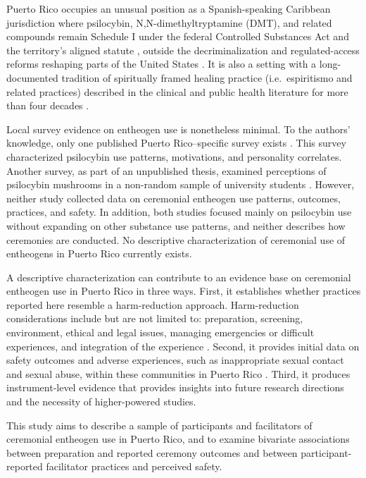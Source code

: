 \documentclass[12pt]{article}
\begin{document}
Puerto Rico occupies an unusual position as a Spanish-speaking Caribbean jurisdiction where psilocybin,
N,N-dimethyltryptamine (DMT), and related compounds remain Schedule I under the federal Controlled Substances Act
\citep{uscongress1970csa} and the territory's aligned statute \citep{pr1971csa}, outside the
decriminalization and regulated-access reforms reshaping parts of the United States
\citep{siegel2023psychedelic}. It is also a setting with a long-documented tradition of spiritually framed
healing practice (i.e.\ espiritismo and related practices) described in the clinical and public health
literature for more than four decades
\citep{koss1980therapist,comasdiaz1981puertorican,bird1981sociopsychiatry,zerrate2022espiritismo}.

Local survey evidence on entheogen use is nonetheless minimal. To the authors' knowledge, only one
published Puerto Rico--specific survey exists \citep{velezrodriguez2026psilocybin}. This survey
characterized psilocybin use patterns, motivations, and personality correlates. Another survey, as part of
an unpublished thesis, examined perceptions of psilocybin mushrooms in a non-random sample of university
students \citep{doeltermorales2020hongos}. However, neither study collected data on ceremonial entheogen
use patterns, outcomes, practices, and safety. In addition, both studies focused mainly on psilocybin use
without expanding on other substance use patterns, and neither describes how ceremonies are conducted. No
descriptive characterization of ceremonial use of entheogens in Puerto Rico currently exists.

A descriptive characterization can contribute to an evidence base on ceremonial entheogen use in Puerto
Rico in three ways. First, it establishes whether practices reported here resemble a harm-reduction
approach. Harm-reduction considerations include but are not limited to: preparation, screening,
environment, ethical and legal issues, managing emergencies or difficult experiences, and integration of
the experience \citep{gorman2021psychedelic,pilecki2021ethical,dutton2025harm}. Second, it provides initial
data on safety outcomes and adverse experiences, such as inappropriate sexual contact and sexual abuse,
within these communities in Puerto Rico \citep{kruger2025psychedelic,peluso2020reflections}. Third, it
produces instrument-level evidence that provides insights into future research directions and the necessity
of higher-powered studies.

This study aims to describe a sample of participants and facilitators of ceremonial entheogen use in Puerto
Rico, and to examine bivariate associations between preparation and reported ceremony outcomes and between
participant-reported facilitator practices and perceived safety.
\end{document}
